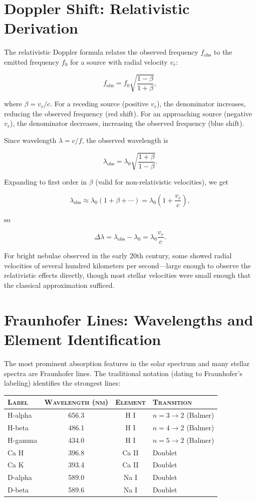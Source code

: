 \section{Doppler Shift: Relativistic Derivation}

The relativistic Doppler formula relates the observed frequency $f_{\text{obs}}$ to the emitted frequency $f_0$ for a source with radial velocity $v_r$:

\[
  f_{\text{obs}} = f_0 \sqrt{\frac{1 - \beta}{1 + \beta}},
\]

where $\beta = v_r/c$. For a receding source (positive $v_r$), the denominator increases, reducing the observed frequency (red shift). For an approaching source (negative $v_r$), the denominator decreases, increasing the observed frequency (blue shift).

Since wavelength $\lambda = c/f$, the observed wavelength is

\[
  \lambda_{\text{obs}} = \lambda_0 \sqrt{\frac{1 + \beta}{1 - \beta}}.
\]

Expanding to first order in $\beta$ (valid for non-relativistic velocities), we get

\[
  \lambda_{\text{obs}} \approx \lambda_0 \left(1 + \beta + \cdots \right) = \lambda_0 \left(1 + \frac{v_r}{c} \right),
\]

so

\[
  \Delta \lambda = \lambda_{\text{obs}} - \lambda_0 = \lambda_0 \frac{v_r}{c}.
\]

For bright nebulae observed in the early 20th century, some showed radial velocities of several hundred kilometers per second—large enough to observe the relativistic effects directly, though most stellar velocities were small enough that the classical approximation sufficed.

\section{Fraunhofer Lines: Wavelengths and Element Identification}

The most prominent absorption features in the solar spectrum and many stellar spectra are Fraunhofer lines. The traditional notation (dating to Fraunhofer's labeling) identifies the strongest lines:

\begin{center}
\begin{tabular}{lccl}
\hline
\textsc{Label} & \textsc{Wavelength (nm)} & \textsc{Element} & \textsc{Transition} \\
\hline
H-alpha & 656.3 & H I & $n=3 \to 2$ (Balmer) \\
H-beta & 486.1 & H I & $n=4 \to 2$ (Balmer) \\
H-gamma & 434.0 & H I & $n=5 \to 2$ (Balmer) \\
Ca H & 396.8 & Ca II & Doublet \\
Ca K & 393.4 & Ca II & Doublet \\
D-alpha & 589.0 & Na I & Doublet \\
D-beta & 589.6 & Na I & Doublet \\
\hline
\end{tabular}
\end{center}

